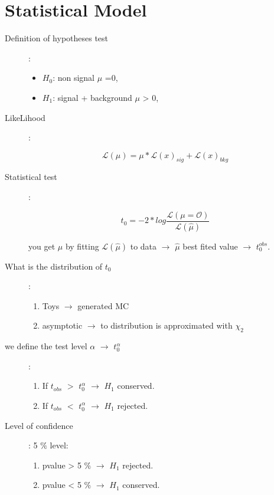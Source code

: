 \section{Statistical Model}


\begin{description}
\item[Definition of hypotheses test]:
 
\begin{itemize}
  \item $H_{0}$: non signal $\mu$ =0,
  \item $H_{1}$: signal + background $\mu$ > 0,
\end{itemize}

\item[LikeLihood]: 

\begin{equation}
\mathcal{L(\mu)} = \mu * \mathcal{L}(x)_{sig} + \mathcal{L}(x)_{bkg}
\end{equation}

\item[Statistical test]:
\begin{center}
\begin{equation}
t_{0} = - 2 * log \frac{\mathcal{L(\mu=O)} }{\mathcal{L(\hat{\mu})} }
\end{equation}
\end{center}

you get $\hat{\mu}$ by fitting $\mathcal{L(\hat{\mu})}$ to data $\rightarrow$ $\hat{\mu}$ best fited value $\rightarrow$ $t_{0}^{obs}$.

\item[What is the distribution of $t_{0}$]:

\begin{enumerate}
\item Toys $\rightarrow$ generated MC
\item asymptotic $\rightarrow$ to distribution is approximated with $\chi_{2}$
\end{enumerate}

\item[we define the test level $\alpha$ $\rightarrow$ $t_{0}^{\alpha}$]:

\begin{enumerate}
\item If $t_{obs}$ $>$ $t_{0}^{\alpha}$ $\rightarrow$ $H_{1}$ conserved.
\item If $t_{obs}$ $<$ $t_{0}^{\alpha}$ $\rightarrow$ $H_{1}$ rejected.
\end{enumerate}

\item[Level of confidence]: 5 $\%$ level:
\begin{enumerate}
\item pvalue > 5 $\%$ $\rightarrow$ $H_{1}$ rejected.
\item pvalue < 5 $\%$ $\rightarrow$ $H_{1}$ conserved.
\end{enumerate}

\end{description}
